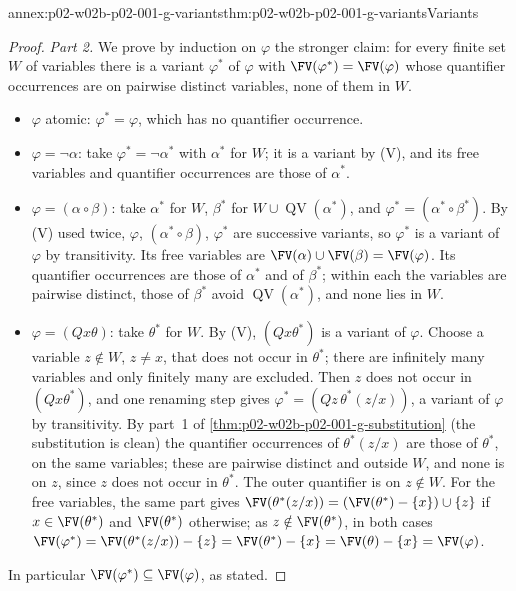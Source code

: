 \begin{annexitem}{annex:p02-w02b-p02-001-g-variants}{thm:p02-w02b-p02-001-g-variants}{Variants}
\begin{proof}
\emph{Part 2.}  We prove by induction on \(\varphi\) the stronger claim:
for every finite set \(W\) of variables there is a variant \(\varphi^{*}\)
of \(\varphi\) with \(\FV(\varphi^{*})=\FV(\varphi)\) whose quantifier
occurrences are on pairwise distinct variables, none of them in \(W\).
\begin{itemize}
\item \(\varphi\) atomic: \(\varphi^{*}=\varphi\), which has no quantifier
      occurrence.
\item \(\varphi=\neg\alpha\): take \(\varphi^{*}=\neg\alpha^{*}\) with
      \(\alpha^{*}\) for \(W\); it is a variant by (V), and its free
      variables and quantifier occurrences are those of \(\alpha^{*}\).
\item \(\varphi=(\alpha\circ\beta)\): take \(\alpha^{*}\) for \(W\),
      \(\beta^{*}\) for \(W\cup\operatorname{QV}(\alpha^{*})\), and
      \(\varphi^{*}=(\alpha^{*}\circ\beta^{*})\).  By (V) used twice,
      \(\varphi\), \((\alpha^{*}\circ\beta)\), \(\varphi^{*}\) are successive
      variants, so \(\varphi^{*}\) is a variant of \(\varphi\) by
      transitivity.  Its free variables are
      \(\FV(\alpha)\cup\FV(\beta)=\FV(\varphi)\).  Its quantifier occurrences
      are those of \(\alpha^{*}\) and of \(\beta^{*}\); within each the
      variables are pairwise distinct, those of \(\beta^{*}\) avoid
      \(\operatorname{QV}(\alpha^{*})\), and none lies in \(W\).
\item \(\varphi=(Qx\theta)\): take \(\theta^{*}\) for \(W\).  By (V),
      \((Qx\theta^{*})\) is a variant of \(\varphi\).  Choose a variable
      \(z\notin W\), \(z\neq x\), that does not occur in \(\theta^{*}\);
      there are infinitely many variables and only finitely many are
      excluded.  Then \(z\) does not occur in \((Qx\theta^{*})\), and one
      renaming step gives \(\varphi^{*}=(Qz\,\theta^{*}(z/x))\), a variant of
      \(\varphi\) by transitivity.  By part~1 of
      \cref{thm:p02-w02b-p02-001-g-substitution} (the substitution is clean)
      the quantifier occurrences of \(\theta^{*}(z/x)\) are those of
      \(\theta^{*}\), on the same variables; these are pairwise distinct and
      outside \(W\), and none is on \(z\), since \(z\) does not occur in
      \(\theta^{*}\).  The outer quantifier is on \(z\notin W\).  For the
      free variables, the same part gives
      \(\FV(\theta^{*}(z/x))=(\FV(\theta^{*})-\{x\})\cup\{z\}\) if
      \(x\in\FV(\theta^{*})\) and \(\FV(\theta^{*})\) otherwise; as
      \(z\notin\FV(\theta^{*})\), in both cases
      \(\FV(\varphi^{*})=\FV(\theta^{*}(z/x))-\{z\}=\FV(\theta^{*})-\{x\}
      =\FV(\theta)-\{x\}=\FV(\varphi)\).
\end{itemize}
In particular \(\FV(\varphi^{*})\subseteq\FV(\varphi)\), as stated.


\end{proof}
\end{annexitem}
